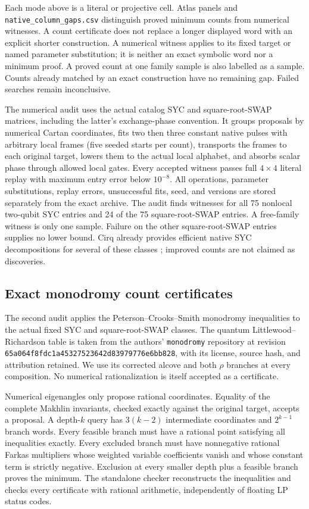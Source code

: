 \documentclass[11pt]{article}
\begin{document}

Each mode above is a literal or projective cell. Atlas panels and
\texttt{native\_column\_gaps.csv} distinguish proved minimum counts from
numerical witnesses. A count certificate does not replace a longer displayed
word with an explicit shorter construction. A numerical witness applies to
its fixed target or named parameter substitution; it is neither an exact
symbolic word nor a minimum proof. A proved count at one family sample is
also labelled as a sample. Counts already matched by an exact construction
have no remaining gap. Failed searches remain inconclusive.

The numerical audit uses the actual catalog SYC and square-root-SWAP matrices,
including the latter's exchange-phase convention. It groups proposals by
numerical Cartan coordinates, fits two then three constant native pulses
with arbitrary local frames (five seeded starts per count), transports the
frames to each original target, lowers them to the actual local alphabet,
and absorbs scalar phase through allowed local gates. Every accepted witness
passes full $4\times4$ literal replay with maximum entry error below $10^{-8}$.
All operations, parameter substitutions, replay errors, unsuccessful fits,
seed, and versions are stored separately from the exact archive.
The audit finds witnesses for all 75 nonlocal two-qubit SYC entries and
24 of the 75 square-root-SWAP entries. A free-family witness is only one
sample. Failure on the other square-root-SWAP entries supplies no lower bound.
Cirq already provides efficient native SYC decompositions for several of
these classes \cite{cirqsyc}; improved counts are not claimed as discoveries.

\subsection{Exact monodromy count certificates}
The second audit applies the Peterson--Crooks--Smith monodromy inequalities
\cite{peterson} to the actual fixed SYC and square-root-SWAP classes.
The quantum Littlewood--Richardson table is taken from the authors'
\texttt{monodromy} repository at revision
\texttt{65a064f8fdc1a45327523642d83979776e6bb828}, with its license,
source hash, and attribution retained. We use its corrected alcove and
both $\rho$ branches at every composition. No numerical rationalization
is itself accepted as a certificate.

Numerical eigenangles only propose rational coordinates. Equality of the
complete Makhlin invariants, checked exactly against the original target,
accepts a proposal. A depth-$k$ query has $3(k-2)$ intermediate coordinates
and $2^{k-1}$ branch words. Every feasible branch must have a rational point
satisfying all inequalities exactly. Every excluded branch must have
nonnegative rational Farkas multipliers whose weighted variable coefficients
vanish and whose constant term is strictly negative. Exclusion at every
smaller depth plus a feasible branch proves the minimum. The standalone
checker reconstructs the inequalities and checks every certificate with
rational arithmetic, independently of floating LP status codes.
\end{document}
